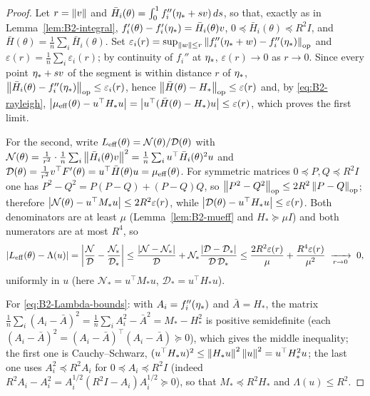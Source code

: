\begin{proof}
Let $r=\left\|v\right\|$ and $\bar H_i(\theta)=\int_0^1f_i''(\eta_\ast+sv)\,ds$, so that, exactly as in
Lemma~\ref{lem:B2-integral}, $f'_i(\theta)-f'_i(\eta_\ast)=\bar H_i(\theta)v$, $0\preccurlyeq\bar H_i(\theta)\preccurlyeq R^2I$,
and $\bar H(\theta)=\frac1n\sum_i\bar H_i(\theta)$. Set
$\varepsilon_i(r)=\sup_{\left\|w\right\|\le r}\left\|f_i''(\eta_\ast+w)-f_i''(\eta_\ast)\right\|_{\mathrm{op}}$ and
$\varepsilon(r)=\frac1n\sum_i\varepsilon_i(r)$; by continuity of $f_i''$ at $\eta_\ast$, $\varepsilon(r)\to0$ as $r\to0$.
Since every point $\eta_\ast+sv$ of the segment is within distance $r$ of $\eta_\ast$,
$\left\|\bar H_i(\theta)-f_i''(\eta_\ast)\right\|_{\mathrm{op}}\le\varepsilon_i(r)$, hence
$\left\|\bar H(\theta)-H_\ast\right\|_{\mathrm{op}}\le\varepsilon(r)$ and, by \eqref{eq:B2-rayleigh},
$\left|\mu_{\mathrm{eff}}(\theta)-u^\top H_\ast u\right|=\left|u^\top(\bar H(\theta)-H_\ast)u\right|\le\varepsilon(r)$, which proves the first limit.

For the second, write $L_{\mathrm{eff}}(\theta)=\mathcal N(\theta)/\mathcal D(\theta)$ with
$\mathcal N(\theta)=\frac1{r^2}\cdot\frac1n\sum_i\left\|\bar H_i(\theta)v\right\|^2=\frac1n\sum_iu^\top\bar H_i(\theta)^2u$ and
$\mathcal D(\theta)=\frac1{r^2}v^\top F'(\theta)=u^\top\bar H(\theta)u=\mu_{\mathrm{eff}}(\theta)$. For symmetric matrices
$0\preccurlyeq P,Q\preccurlyeq R^2I$ one has $P^2-Q^2=P(P-Q)+(P-Q)Q$, so
$\left\|P^2-Q^2\right\|_{\mathrm{op}}\le2R^2\left\|P-Q\right\|_{\mathrm{op}}$; therefore
$\left|\mathcal N(\theta)-u^\top M_\ast u\right|\le2R^2\varepsilon(r)$, while $\left|\mathcal D(\theta)-u^\top H_\ast u\right|\le\varepsilon(r)$.
Both denominators are at least $\mu$ (Lemma~\ref{lem:B2-mueff} and $H_\ast\succcurlyeq\mu I$) and both
numerators are at most $R^4$, so
\[
\left|L_{\mathrm{eff}}(\theta)-\Lambda(u)\right|
=\left|\frac{\mathcal N}{\mathcal D}-\frac{\mathcal N_\ast}{\mathcal D_\ast}\right|
\le\frac{\left|\mathcal N-\mathcal N_\ast\right|}{\mathcal D}+\mathcal N_\ast\frac{\left|\mathcal D-\mathcal D_\ast\right|}{\mathcal D\,\mathcal D_\ast}
\le\frac{2R^2\varepsilon(r)}{\mu}+\frac{R^4\varepsilon(r)}{\mu^2}\;\xrightarrow[r\to0]{}\;0 ,
\]
uniformly in $u$ (here $\mathcal N_\ast=u^\top M_\ast u$, $\mathcal D_\ast=u^\top H_\ast u$).

For \eqref{eq:B2-Lambda-bounds}: with $A_i=f_i''(\eta_\ast)$ and $\bar A=H_\ast$, the matrix
$\frac1n\sum_i(A_i-\bar A)^2=\frac1n\sum_iA_i^2-\bar A^2=M_\ast-H_\ast^2$ is positive semidefinite (each
$(A_i-\bar A)^2=(A_i-\bar A)^\top(A_i-\bar A)\succcurlyeq0$), which gives the middle inequality; the first one
is Cauchy--Schwarz, $(u^\top H_\ast u)^2\le\left\|H_\ast u\right\|^2\left\|u\right\|^2=u^\top H_\ast^2u$; the last one uses
$A_i^2\preccurlyeq R^2A_i$ for $0\preccurlyeq A_i\preccurlyeq R^2I$ (indeed $R^2A_i-A_i^2=A_i^{1/2}(R^2I-A_i)A_i^{1/2}\succcurlyeq0$),
so that $M_\ast\preccurlyeq R^2H_\ast$ and $\Lambda(u)\le R^2$.
\end{proof}

